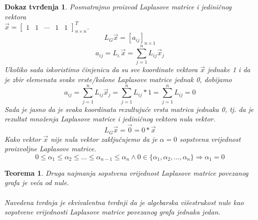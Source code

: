 \documentclass[11pt]{article}
\newtheorem{theorem}{Teorema}
\newtheorem*{custom_proof}{Dokaz tvrđenja}
\begin{document}
	\begin{custom_proof}
	Posmatrajmo proizvod Laplasove matrice i jediničnog vektora \\ $\vec{x}=\begin{bmatrix} 1 & 1 & \cdots & 1 & 1  \end{bmatrix}^T_{n \times n}$.
	\[
	L_G\vec{x} = [a_{ij}]_{n \times 1}
	\]
	\[
		a_{ij} = L_{i.}\vec{x} = \sum_{j=1}^{n}L_{ij} \vec{x}_j 
	\]
	Ukoliko sada iskoristimo činjenicu da su sve koordinate vektora $\vec{x}$ jednake 1 i da je zbir elemenata svake vrste/kolone Laplasove matrice jednak 0, dobijamo
	\[
		a_{ij} = \sum_{j=1}^{n}L_{ij} \vec{x}_j = \sum_{j=1}^{n}L_{ij} * 1 = \sum_{j=1}^{n}L_{ij} = 0
	\]
	Sada je jasno da je svaka koordinata rezultujuće vrsta matrica jednaka 0, tj. da je rezultat množenja Laplasove matrice i jediničnog vektora nula vektor.
	\[
	L_G\vec{x} = \vec{0} = 0 * \vec{x}
	\]
	Kako vektor $\vec{x}$ nije nula vektor zaključujemo da je $\alpha = 0$ sopstvena vrijednost proizvoljne Laplasove matrice.
	\[
		0 \leq \alpha_1 \leq \alpha_2 \leq \dots \leq \alpha_{n-1} \leq \alpha_n \land 0 \in \{\alpha_1, \alpha_2, \dots, \alpha_n\} \Rightarrow \alpha_1 = 0
	\]
	\end{custom_proof}
	
	\begin{theorem} Druga najmanja sopstvena vrijednost Laplasove matrice povezanog grafa je veća od nule.
	\paragraph{}
	Navedena tvrdnja je ekvivalentna tvrdnji da je algebarska višestrukost nule kao sopstvene vrijednosti Laplasove matrice povezanog grafa jednaka jedan.
	\end{theorem}
	
\end{document}
